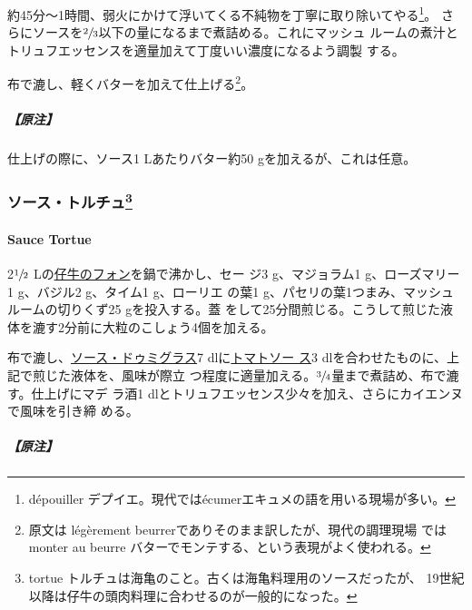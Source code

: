 約45分〜1時間、弱火にかけて浮いてくる不純物を丁寧に取り除いてやる\footnote{dépouiller
  デプイエ。現代ではécumerエキュメの語を用いる現場が多い。}。
さらにソースを\(\sfrac{2}{3}\)以下の量になるまで煮詰める。これにマッシュ
ルームの煮汁とトリュフエッセンスを適量加えて丁度いい濃度になるよう調製
する。

布で漉し、軽くバターを加えて仕上げる\footnote{原文は légèrement
  beurrerでありそのまま訳したが、現代の調理現場 ではmonter au beurre
  バターでモンテする、という表現がよく使われる。}。

\hypertarget{ux539fux6ce8-9}{%
\subparagraph{【原注】}\label{ux539fux6ce8-9}}

仕上げの際に、ソース1 Lあたりバター約50 gを加えるが、これは任意。

\maeaki

\hypertarget{ux30bdux30fcux30b9ux30c8ux30ebux30c1ux30e593}{%
\subsubsection[ソース・トルチュ]{\texorpdfstring{ソース・トルチュ\footnote{tortue
  トルチュは海亀のこと。古くは海亀料理用のソースだったが、
  19世紀以降は仔牛の頭肉料理に合わせるのが一般的になった。}}{ソース・トルチュ}}\label{ux30bdux30fcux30b9ux30c8ux30ebux30c1ux30e593}}

\hypertarget{sauce-tortue}{%
\paragraph{Sauce Tortue}\label{sauce-tortue}}


2\(\sfrac{1}{2}\)
Lの\protect\hyperlink{fonds-de-veau-brun}{仔牛のフォン}を鍋で沸かし、セー
ジ3 g、マジョラム1 g、ローズマリー1 g、バジル2 g、タイム1 g、ローリエ
の葉1 g、パセリの葉1つまみ、マッシュルームの切りくず25 gを投入する。蓋
をして25分間煎じる。こうして煎じた液体を漉す2分前に大粒のこしょう4個を加える。

布で漉し、\protect\hyperlink{sauce-demi-glace}{ソース・ドゥミグラス}7
dlに\protect\hyperlink{sauce-tomate}{トマトソー ス}3
dlを合わせたものに、上記で煎じた液体を、風味が際立
つ程度に適量加える。\(\sfrac{3}{4}\)量まで煮詰め、布で漉す。仕上げにマデ
ラ酒1 dlとトリュフエッセンス少々を加え、さらにカイエンヌで風味を引き締
める。

\hypertarget{ux539fux6ce8-10}{%
\subparagraph{【原注】}\label{ux539fux6ce8-10}}

